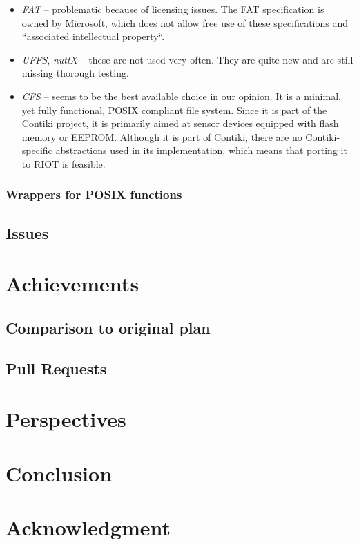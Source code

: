 \documentclass[conference]{IEEEtran}
\begin{document}
\begin{itemize}
  \item \emph{FAT}\cite{fat} -- problematic because of licensing issues. The FAT
    specification is owned by Microsoft, which does not allow free use
    of these specifications and ``associated intellectual
    property``\cite{fatlicense}.
  \item \emph{UFFS}\cite{uffs}, \emph{nuttX}\cite{nuttx} -- these are
    not used very often. They are quite new and are still missing
    thorough testing.
  \item \emph{CFS}\cite{cfs} -- seems to be the best available choice in
    our opinion. It is a minimal, yet fully functional, POSIX compliant
    file system. Since it is part of the Contiki project\cite{contiki},
    it is primarily aimed at sensor devices equipped with flash memory
    or EEPROM. Although it is part of Contiki, there are no
    Contiki-specific abstractions used in its implementation, which
    means that porting it to RIOT is feasible.
\end{itemize}

\subsubsection{Wrappers for POSIX functions}
\label{ssub:Wrappers for POSIX functions}

\subsection{Issues}
\label{sub:Issues}

\section{Achievements}
\label{sec:Achievements}

\subsection{Comparison to original plan}
\label{sub:Comparison to original plan}

\subsection{Pull Requests}
\label{sub:Pull Requests}

\section{Perspectives}
\label{sec:Perspectives}

\section{Conclusion}
\label{sec:Conclusion}

\section*{Acknowledgment}
\label{sec:Acknowledgement}



\end{document}
